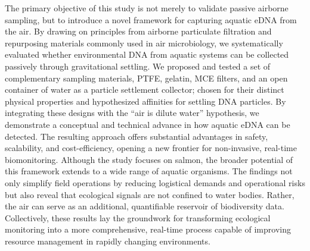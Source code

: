 \documentclass{article}
\begin{document}
The primary objective of this study is not merely to validate passive airborne sampling, but to introduce a novel framework for capturing aquatic eDNA from the air. By drawing on principles from airborne particulate filtration and repurposing materials commonly used in air microbiology, we systematically evaluated whether environmental DNA from aquatic systems can be collected passively through gravitational settling. We proposed and tested a set of complementary sampling materials, PTFE, gelatin, MCE filters, and an open container of water as a particle settlement collector; chosen for their distinct physical properties and hypothesized affinities for settling DNA particles. By integrating these designs with the “air is dilute water” hypothesis, we demonstrate a conceptual and technical advance in how aquatic eDNA can be detected. The resulting approach offers substantial advantages in safety, scalability, and cost-efficiency, opening a new frontier for non-invasive, real-time biomonitoring. Although the study focuses on salmon, the broader potential of this framework extends to a wide range of aquatic organisms. The findings not only simplify field operations by reducing logistical demands and operational risks but also reveal that ecological signals are not confined to water bodies. Rather, the air can serve as an additional, quantifiable reservoir of biodiversity data. Collectively, these results lay the groundwork for transforming ecological monitoring into a more comprehensive, real-time process capable of improving resource management in rapidly changing environments.
\end{document}
